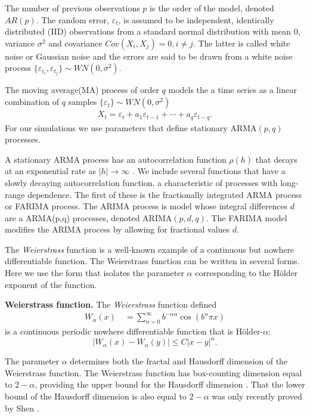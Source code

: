 The number of previous observations $p$ is the order of the 
model, denoted $AR(p)$. The random error, $\varepsilon_t$, 
is assumed to be independent, identically distributed (IID) observations from a standard normal distribution with 
mean 0, variance $\sigma^2$ and covariance 
$Cov(X_i, X_j) = 0, i \neq j$. The latter is called 
white noise or Gaussian noise and the errors are said to be 
drawn from a white noise process 
$\{ \varepsilon_{t_i}, \varepsilon_{t_j}\} \sim WN(0, \sigma^2)$. 

The moving average(MA) process of order $q$ models
the a time series as a linear combination of $q$
samples $\{ \varepsilon_t \} \sim WN(0, \sigma^2)$  
\begin{align}
  X_t = \varepsilon_t + a_1 \varepsilon_{t-1} + 
\cdots + a_q \varepsilon_{t-q}.
\end{align}
For our simulations we use parameters that define stationary ARMA$(p,q)$ processes.

A stationary ARMA process has an autocorrelation  
function $\rho(h)$ that decays at an exponential rate 
as $|h| \to \infty$ \cite{fan2003}.   
We include several functions that have a slowly decaying autocorrelation function, a characteristic of processes with long-range dependence. The first of these is the fractionally integrated ARMA process or FARIMA process. 
The ARIMA process is model whose integral 
differences $d$ are a ARMA(p,q) processes,
denoted ARIMA$(p,d,q)$.  
The FARIMA model modifies the ARIMA process by 
allowing for fractional values $d$\cite{fan2003}.

The \textit{Weierstrass} function is 
a well-known example of a continuous but nowhere differentiable function. The Weierstrass function can be written in several forms. Here we use the form that isolates the parameter $\alpha$ corresponding to the H\"older exponent of the function. 
\begin{defn}\textbf{Weierstrass function.} \label{def:weierstrass}
  The \textit{Weierstrass} function defined
  \begin{align}
    W_{\alpha}(x) 
  \hspace{1em}= \sum_{n = 0}^{\infty} b^{-n \alpha} \cos(b^n \pi x)
  \end{align}
  is a continuous 
  periodic nowhere differentiable function 
  that is H\"older-$\alpha$:  
  \[
  \left| W_{\alpha}(x) - W_{\alpha}(y) \right| 
  \leq C \left| x - y \right|^{\alpha}.
\]  
\end{defn}
The parameter $\alpha$ determines both the fractal and 
Hausdorff dimension of the Weierstrass function. 
The Weierstrass function has box-counting dimension equal to $2-\alpha$, providing the upper bound for the Hausdorff dimension \cite{falconer2003}. That the lower bound of the Hausdorff dimension is also equal to $2-\alpha$ was only recently proved by Shen \cite{shen2015}. 


